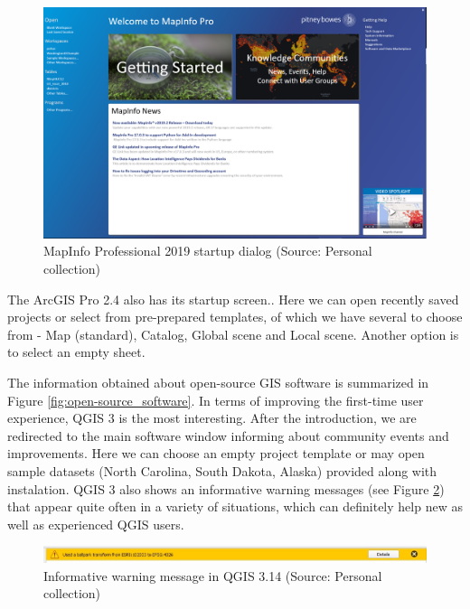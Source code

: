 \documentclass[a4paper,10pt,twoside]{article}
\begin{document}
\vspace{0.3cm}
\begin{figure}[hbt!] 
\begin{center}
\includegraphics[width=16cm]{../pictures/map_info_startup_screen.PNG} 
\caption[MapInfo Professional 2019 startup dialog]{MapInfo Professional 2019 startup dialog (Source: Personal collection)}
\label{fig:map_info_startup_screen}
\end{center}
\end{figure}

\noindent The ArcGIS Pro 2.4 also has its startup screen.. Here we can open recently saved projects or select from pre-prepared templates, of which we have several to choose from - Map (standard), Catalog, Global scene and Local scene. Another option is to select an empty sheet.

The information obtained about open-source GIS software is summarized in Figure \ref{fig:open-source_software}. In terms of improving the first-time user experience, QGIS 3 is the most interesting. After the introduction, we are redirected to the main software window informing about community events and improvements. Here we can choose an empty project template or may open sample datasets (North Carolina, South Dakota, Alaska) provided along with instalation. QGIS 3 also shows an informative warning messages (see Figure \ref{fig:qgis_warning_window}) that appear quite often in a variety of situations, which can definitely help new as well as experienced QGIS users.

\vspace{0.3cm}
\begin{figure}[hbt!] 
\begin{center}
\includegraphics[width=17cm]{../pictures/qgis_warning_window.JPG} 
\caption[Informative warning message  in QGIS 3.14]{Informative warning message  in QGIS 3.14 (Source: Personal collection)}
\label{fig:qgis_warning_window}
\end{center}
\end{figure}
\end{document}
